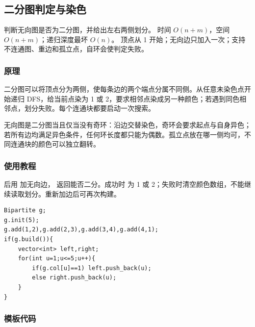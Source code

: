 \subsection{二分图判定与染色}
\label{algo:bipartite}
\AlgorithmInfo
    {判断无向图是否为二分图，并给出左右两侧划分。}
    {时间 $O(n+m)$，空间 $O(n+m)$；递归深度最坏 $O(n)$。}
    {顶点从 1 开始；无向边只加入一次；支持不连通图、重边和孤立点，自环会使判定失败。}

\subsubsection*{原理}
二分图可以将顶点分为两侧，使每条边的两个端点分属不同侧。从任意未染色点开始递归 DFS，给当前点染为 1 或 2，要求相邻点染成另一种颜色；若遇到同色相邻点，划分失败。每个连通块都要启动一次搜索。

无向图是二分图当且仅当没有奇环：沿边交替染色，奇环会要求起点与自身异色；若所有边均满足异色条件，任何环长度都只能为偶数。孤立点放在哪一侧均可，不同连通块的颜色可以独立翻转。

\subsubsection*{使用教程}
 后用  加无向边， 返回能否二分。成功时  为 1 或 2；失败时清空颜色数组，不能继续读取划分。重新加边后可再次构建。
\begin{lstlisting}[style=mtycpp,numbers=none]
Bipartite g;
g.init(5);
g.add(1,2),g.add(2,3),g.add(3,4),g.add(4,1);
if(g.build()){
	vector<int> left,right;
	for(int u=1;u<=5;u++){
		if(g.col[u]==1) left.push_back(u);
		else right.push_back(u);
	}
}
\end{lstlisting}

\subsubsection*{模板代码}
